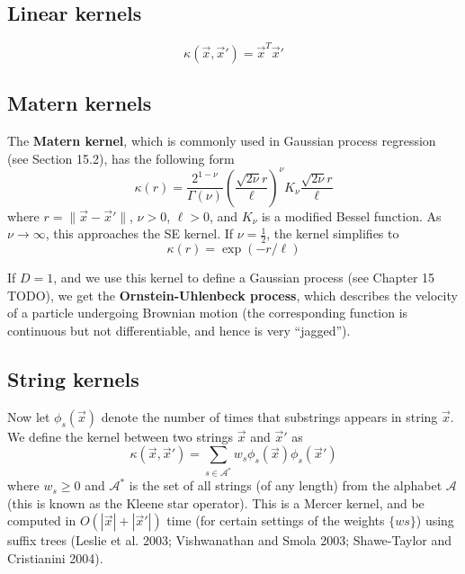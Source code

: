 \subsection{Linear kernels}
\begin{equation}
\kappa(\vec{x},\vec{x}')=\vec{x}^T\vec{x}'
\end{equation}

\subsection{Matern kernels}
The \textbf{Matern kernel}, which is commonly used in Gaussian process regression (see Section 15.2), has the following form
\begin{equation}
\kappa(r)=\frac{2^{1-\nu}}{\Gamma(\nu)}\left(\frac{\sqrt{2\nu}r}{\ell}\right)^{\nu}K_{\nu}\frac{\sqrt{2\nu}r}{\ell}
\end{equation}
where $r=\lVert\vec{x}-\vec{x}'\rVert$, $\nu>0$, $\ell>0$, and $K_{\nu}$ is a modified Bessel function. As $\nu \rightarrow \infty$, this approaches the SE kernel. If $\nu=\frac{1}{2}$, the kernel simplifies to
\begin{equation}
\kappa(r)=\exp(-r/\ell)
\end{equation}

If $D=1$, and we use this kernel to define a Gaussian process (see Chapter 15 TODO), we get the \textbf{Ornstein-Uhlenbeck process}, which describes the velocity of a particle undergoing Brownian motion (the corresponding function is continuous but not differentiable, and hence is very “jagged”).


\subsection{String kernels}
\label{sec:String-kernels}
Now let $\phi_s(\vec{x})$ denote the number of times that substrings appears in string $\vec{x}$. We define the kernel between two strings $\vec{x}$ and $\vec{x}'$ as
\begin{equation}
\kappa(\vec{x},\vec{x}')=\sum\limits_{s \in \mathcal{A}^*} w_s\phi_s(\vec{x})\phi_s(\vec{x}')
\end{equation}
where $w_s \geq 0$ and $\mathcal{A}^*$ is the set of all strings (of any length) from the alphabet $\mathcal{A}$(this is known as the Kleene star operator). This is a Mercer kernel, and be computed in $O(|\vec{x}|+|\vec{x}'|)$ time (for certain settings of the weights $\{ws\}$) using suffix trees (Leslie et al. 2003; Vishwanathan and Smola 2003; Shawe-Taylor and Cristianini 2004).

